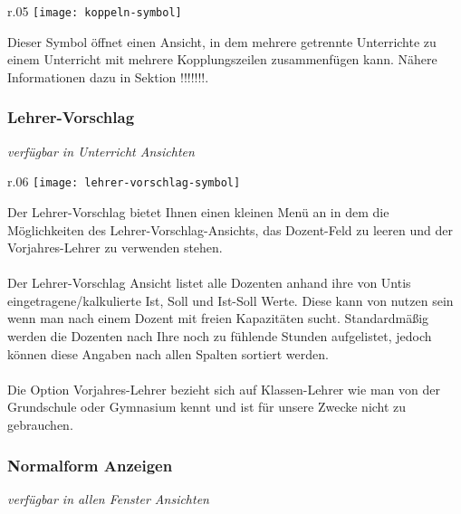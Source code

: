 \begin{wrapfigure}{r}{.05\textwidth}
	\vspace{-50pt}
	\texttt{[image: koppeln-symbol]}
	\vspace{-35pt}
\end{wrapfigure}

\noindent
Dieser Symbol öffnet einen Ansicht, in dem mehrere getrennte Unterrichte zu einem Unterricht mit mehrere Kopplungszeilen zusammenfügen kann. Nähere Informationen dazu in Sektion !!!!!!!.\\

\subsubsection{Lehrer-Vorschlag}
{\small\textit{verfügbar in Unterricht Ansichten\\}\par}

\begin{wrapfigure}{r}{.06\textwidth}
	\vspace{-50pt}
	\texttt{[image: lehrer-vorschlag-symbol]}
	\vspace{-35pt}
\end{wrapfigure}

\noindent
Der Lehrer-Vorschlag bietet Ihnen einen kleinen Menü an in dem die Möglichkeiten des Lehrer-Vorschlag-Ansichts, das Dozent-Feld zu leeren und der Vorjahres-Lehrer zu verwenden stehen.\\
\\
Der Lehrer-Vorschlag Ansicht listet alle Dozenten anhand ihre von Untis eingetragene/kalkulierte Ist, Soll und Ist-Soll Werte. Diese kann von nutzen sein wenn man nach einem Dozent mit freien Kapazitäten sucht. Standardmäßig werden die Dozenten nach Ihre noch zu fühlende Stunden aufgelistet, jedoch können diese Angaben nach allen Spalten sortiert werden.\\
\\
Die Option Vorjahres-Lehrer bezieht sich auf Klassen-Lehrer wie man von der Grundschule oder Gymnasium kennt und ist für unsere Zwecke nicht zu gebrauchen.\\

\subsubsection{Normalform Anzeigen}
{\small\textit{verfügbar in allen Fenster Ansichten\\}\par}

